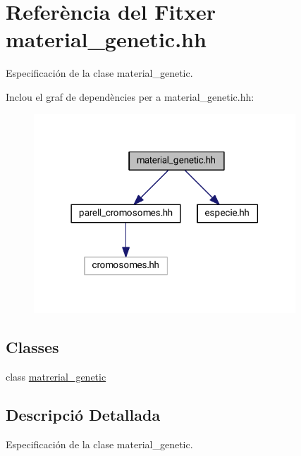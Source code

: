 \hypertarget{material__genetic_8hh}{}\section{Referència del Fitxer material\+\_\+genetic.\+hh}
\label{material__genetic_8hh}


Especificación de la clase material\+\_\+genetic.  


Inclou el graf de dependències per a material\+\_\+genetic.\+hh\+:
\nopagebreak
\begin{figure}[H]
\begin{center}
\leavevmode
\includegraphics[width=278pt]{material__genetic_8hh__incl}
\end{center}
\end{figure}
\subsection*{Classes}
\begin{DoxyCompactItemize}
\item 
class \hyperlink{classmatrerial__genetic}{matrerial\+\_\+genetic}
\end{DoxyCompactItemize}


\subsection{Descripció Detallada}
Especificación de la clase material\+\_\+genetic. 

